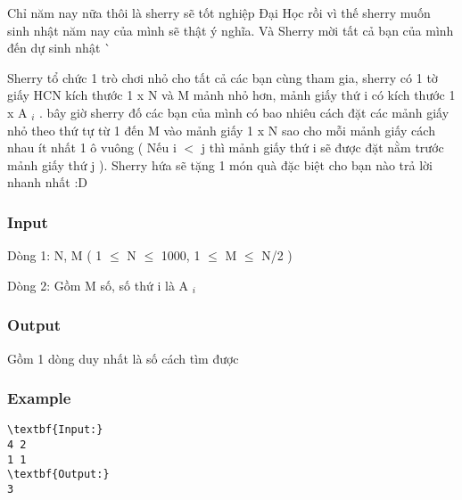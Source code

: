 



   Chỉ năm nay nữa thôi là sherry sẽ tốt nghiệp Đại Học rồi vì thế sherry muốn sinh nhật năm nay của mình sẽ thật ý nghĩa. Và Sherry mời tất cả bạn của mình đến dự sinh nhật ^^  

   Sherry tổ chức 1 trò chơi nhỏ cho tất cả các bạn cùng tham gia, sherry có 1 tờ giấy HCN kích thước 1 x N và M mảnh nhỏ hơn, mảnh giấy thứ i có kích thước 1 x A   $_    i   $   . bây giờ sherry đố các bạn của mình có bao nhiêu cách đặt các mảnh giấy nhỏ theo thứ tự từ 1 đến M  vào mảnh giấy 1 x N sao cho mỗi mảnh giấy cách nhau ít nhất 1 ô vuông ( Nếu i $<$ j thì mảnh giấy thứ i sẽ được đặt nằm trước mảnh giấy thứ j ). Sherry hứa sẽ tặng 1 món quà đặc biệt cho bạn nào trả lời nhanh nhất :D  

\subsubsection{   Input  }

   Dòng 1: N, M ( 1  $\le$  N  $\le$  1000, 1  $\le$  M  $\le$  N/2 )  

   Dòng 2: Gồm M số, số  thứ  i  là   A   $_    i   $

\subsubsection{   Output  }

   Gồm 1 dòng duy nhất là số cách tìm được  

\subsubsection{   Example  }
\begin{verbatim}
\textbf{Input:}
4 2
1 1
\textbf{Output:}
3
\end{verbatim}
